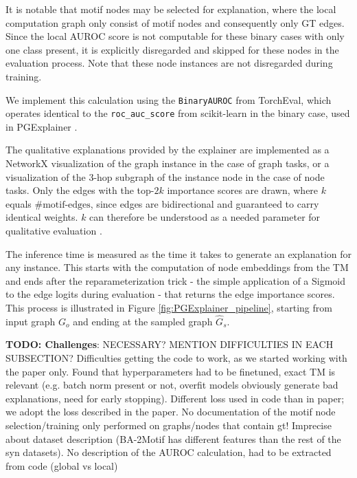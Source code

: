 It is notable that motif nodes may be selected for explanation, where the local computation graph only consist of motif nodes and consequently only \ac{GT} edges. Since the local AUROC score is not computable for these binary cases with only one class present, it is explicitly disregarded and skipped for these nodes in the evaluation process. Note that these node instances are not disregarded during training.

We implement this calculation using the \lstinline|BinaryAUROC| from TorchEval, which operates identical to the \lstinline|roc_auc_score| from scikit-learn \cite{pedregosa2011scikit} in the binary case, used in PGExplainer \cite{luo2020parameterized}.

The qualitative explanations provided by the explainer are implemented as a NetworkX visualization of the graph instance in the case of graph tasks, or a visualization of the $3$-hop subgraph of the instance node in the case of node tasks. Only the edges with the top-$2k$ importance scores are drawn, where $k$ equals $\text{\#motif-edges}$, since edges are bidirectional and guaranteed to carry identical weights. $k$ can therefore be understood as a needed parameter for qualitative evaluation \cite{holdijk2021re}. \bigskip

The inference time is measured as the time it takes to generate an explanation for any instance. This starts with the computation of node embeddings from the \ac{TM} and ends after the reparameterization trick - the simple application of a Sigmoid to the edge logits during evaluation - that returns the edge importance scores. This process is illustrated in Figure \ref{fig:PGExplainer_pipeline}, starting from input graph $G_o$ and ending at the sampled graph $\hat{G}_s$. \bigskip

\textbf{TODO: Challenges}: NECESSARY? MENTION DIFFICULTIES IN EACH SUBSECTION? Difficulties getting the code to work, as we started working with the paper only. Found that hyperparameters had to be finetuned, exact \ac{TM} is relevant (e.g. batch norm present or not, overfit models obviously generate bad explanations, need for early stopping). Different loss used in code than in paper; we adopt the loss described in the paper. No documentation of the motif node selection/training only performed on graphs/nodes that contain gt! Imprecise about dataset description (BA-2Motif has different features than the rest of the syn datasets). No description of the AUROC calculation, had to be extracted from code (global vs local) \bigskip

